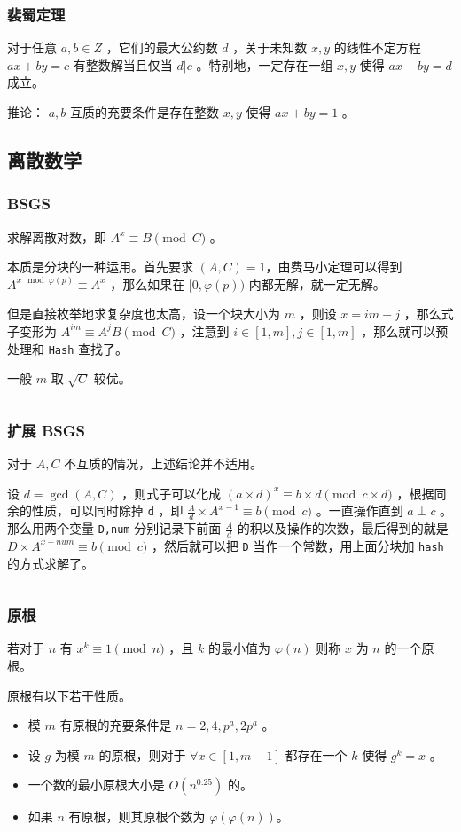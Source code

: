 \documentclass[UTF-8]{ctexart}
\newcommand{\cpp}[1]{\inputminted[bgcolor=bg,breaklines,breakanywhere=true]{c++}{#1}}
\begin{document}
			\subsubsection{裴蜀定理}
			对于任意 $a,b \in Z$ ，它们的最大公约数 $d$ ，关于未知数 $x,y$ 的线性不定方程 $ax+by=c$ 有整数解当且仅当 $d|c$ 。特别地，一定存在一组 $x,y$ 使得 $ax+by=d$ 成立。
	
			推论： $a,b$ 互质的充要条件是存在整数 $x,y$ 使得 $ax+by=1$ 。
		\subsection{离散数学}
			\subsubsection{BSGS}
			求解离散对数，即 $A^x \equiv B \pmod C$ 。
	
			本质是分块的一种运用。首先要求 $(A,C)=1$，由费马小定理可以得到 $A ^ {x \mod \varphi(p)} \equiv A ^ x$ ，那么如果在 $[0,\varphi(p))$ 内都无解，就一定无解。
	
			但是直接枚举地求复杂度也太高，设一个块大小为 $m$ ，则设 $x=im-j$ ，那么式子变形为 $A^{im} \equiv A^jB \pmod C$ ，注意到 $i \in [1,m],j \in [1,m]$ ，那么就可以预处理和 \texttt{Hash} 查找了。
	
			一般 $m$ 取 $\sqrt{C}$ 较优。
			\cpp{code//Math//bsgs.cpp}
			\subsubsection{扩展 BSGS}
			对于 $A,C$ 不互质的情况，上述结论并不适用。
	
			设 $d=\gcd(A,C)$ ，则式子可以化成 $(a \times d)^x \equiv b \times d \pmod {c \times d}$ ，根据同余的性质，可以同时除掉 \texttt{d} ，即 $\frac{A}{d} \times A^{x-1} \equiv b \pmod c$ 。一直操作直到 $a \perp c$ 。那么用两个变量 \texttt{D,num} 分别记录下前面 $\frac{A}{d}$ 的积以及操作的次数，最后得到的就是 $D \times A^{x-num} \equiv b \pmod c$ ，然后就可以把 \texttt{D} 当作一个常数，用上面分块加 \texttt{hash} 的方式求解了。
			
			\cpp{code//Math//exbsgs.cpp}
			\subsubsection{原根}
			若对于 $n$ 有 $x ^ k \equiv 1 \pmod n$ ，且 $k$ 的最小值为 $\varphi(n)$ 则称 $x$ 为 $n$ 的一个原根。
			
			原根有以下若干性质。
			\begin{itemize}
				\item 模 $m$ 有原根的充要条件是 $n=2,4,p^a,2p^a$ 。
				\item 设 $g$ 为模 $m$ 的原根，则对于 $\forall x \in [1,m-1]$ 都存在一个 $k$ 使得 $g^k=x$ 。
				\item 一个数的最小原根大小是 $O(n^{0.25})$ 的。
				\item 如果 $n$ 有原根，则其原根个数为 $\varphi(\varphi(n))$。
			\end{itemize}
\end{document}
